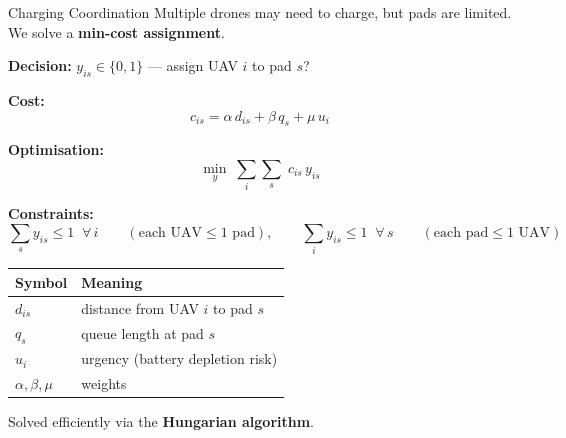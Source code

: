 \documentclass[aspectratio=169,12pt]{beamer}
\begin{document}
\begin{frame}{Charging Coordination}
Multiple drones may need to charge, but pads are limited.
We solve a \textbf{min-cost assignment}.

\vspace{0.3em}
\textbf{Decision:} $y_{is} \in \{0,1\}$ --- assign UAV $i$ to pad $s$?

\vspace{0.3em}
\textbf{Cost:}
\[
c_{is} = \alpha\, d_{is} + \beta\, q_s + \mu\, u_i
\]

\vspace{0.3em}
\textbf{Optimisation:}
\[
\min_{y}\; \sum_{i}\sum_{s}\; c_{is}\, y_{is}
\]

\vspace{0.3em}
\textbf{Constraints:}
\[
\sum_{s} y_{is} \le 1 \;\;\forall\, i
\qquad(\text{each UAV} \le \text{1 pad}),
\qquad
\sum_{i} y_{is} \le 1 \;\;\forall\, s
\qquad(\text{each pad} \le \text{1 UAV})
\]

\vspace{0.3em}
\begin{tabular}{@{}ll@{}}
\toprule
\textbf{Symbol} & \textbf{Meaning} \\
\midrule
$d_{is}$ & distance from UAV $i$ to pad $s$ \\
$q_s$ & queue length at pad $s$ \\
$u_i$ & urgency (battery depletion risk) \\
$\alpha, \beta, \mu$ & weights \\
\bottomrule
\end{tabular}

Solved efficiently via the \textbf{Hungarian algorithm}.
\end{frame}
\end{document}
